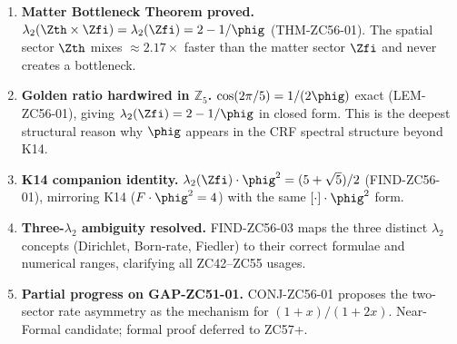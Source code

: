 \documentclass[12pt, a4paper]{article}
\begin{document}
\begin{enumerate}[leftmargin=2em]

\item \textbf{Matter Bottleneck Theorem proved.}
  $\lambda_2(\Zth\times\Zfi)=\lambda_2(\Zfi)=2-1/\phig$
  (THM-ZC56-01).  The spatial sector $\Zth$ mixes
  $\approx2.17\times$ faster than the matter sector $\Zfi$
  and never creates a bottleneck.

\item \textbf{Golden ratio hardwired in $\mathbb{Z}_5$.}
  $\cos(2\pi/5)=1/(2\phig)$ exact (LEM-ZC56-01), giving
  $\lambda_2(\Zfi)=2-1/\phig$ in closed form.
  This is the deepest structural reason why $\phig$ appears
  in the CRF spectral structure beyond K14.

\item \textbf{K14 companion identity.}
  $\lambda_2(\Zfi)\cdot\phig^2=(5+\sqrt{5})/2$ (FIND-ZC56-01),
  mirroring K14 ($F\cdot\phig^2=4$) with the same
  $[\cdot]\cdot\phig^2$ form.

\item \textbf{Three-$\lambda_2$ ambiguity resolved.}
  FIND-ZC56-03 maps the three distinct $\lambda_2$ concepts
  (Dirichlet, Born-rate, Fiedler) to their correct formulae
  and numerical ranges, clarifying all ZC42--ZC55 usages.

\item \textbf{Partial progress on GAP-ZC51-01.}
  CONJ-ZC56-01 proposes the two-sector rate asymmetry as the
  mechanism for $(1+x)/(1+2x)$.  Near-Formal candidate;
  formal proof deferred to ZC57+.

\end{enumerate}
\end{document}
